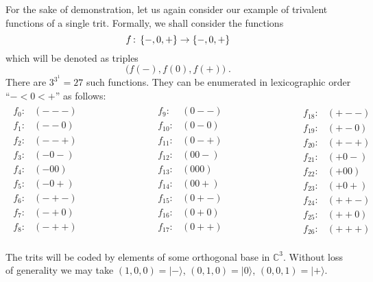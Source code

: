 \documentclass[pra,amsfonts,showpacs,showkeys,preprint]{revtex4}
\begin{document}
For the sake of demonstration, let us again consider our example of trivalent functions of a single trit.
Formally, we shall consider the functions $$f \,{:}\linebreak[0]\,\;
\{-,0,+\} \to \{-,0,+\}$$ which will be denoted as triples
$$\bigl( f(-), f(0), f(+) \bigr)\; .$$
There are $3^{3^1} = 27$ such functions.
They can be enumerated in lexicographic order ``$-<0<+$'' as follows:
$$
\begin{array}{lllll}
\begin{array}{ll}
f_{0}: & (---)\\  f_{1}: & (--0)\\  f_{2}: & (--+)\\ f_{3}: & (-0-)\\  f_{4}: & (-00)\\  f_{5}: & (-0+)\\  f_{6}: & (-+-)\\  f_{7}: & (-+0)\\  f_{8}: & (-++)\\
\end{array}
&   \qquad \qquad \qquad &
\begin{array}{ll}
f_{9}: & (0--)\\  f_{10}: & (0-0)\\  f_{11}: & (0-+)\\ f_{12}: & (00-)\\  f_{13}: & (000)\\  f_{14}: & (00+)\\ f_{15}: & (0+-)\\  f_{16}: & (0+0)\\  f_{17}: & (0++)\\
\end{array}
&   \qquad \qquad \qquad &
\begin{array}{ll}
f_{18}: & (+--)\\  f_{19}: & (+-0)\\  f_{20}: & (+-+)\\ f_{21}: & (+0-)\\  f_{22}: & (+00)\\  f_{23}: & (+0+)\\ f_{24}: & (++-)\\  f_{25}: & (++0)\\  f_{26}: & (+++)
\end{array}
\end{array}
$$

 The trits will be coded by
elements of some  orthogonal base in ${\mathbb{C}}^3$. Without loss of
generality we may take
$(1,0,0) = |-\rangle$, $(0,1,0) = |0\rangle$,
$(0,0,1) = |+\rangle $.
\end{document}
